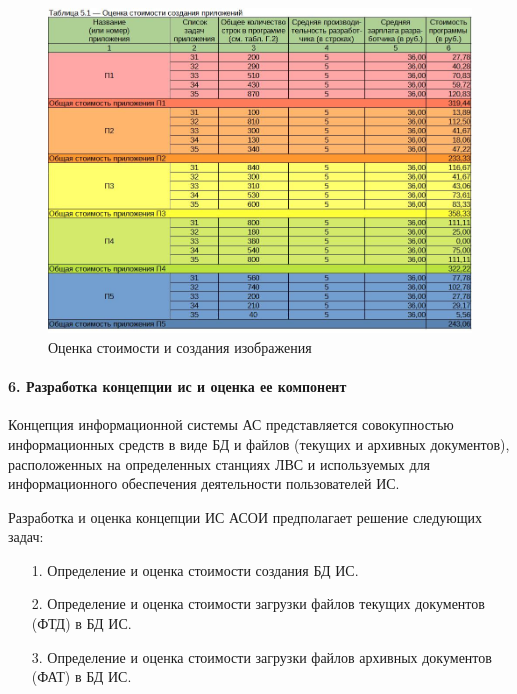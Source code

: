 \documentclass[12pt, a4paper, simple]{eskdtext}
\begin{document}
    \begin{figure}[ph!]
        \centering
        \includegraphics[width=16cm]
            {_docs/Таблица5-1ОценкаСтоимостиСозданияПриложений.jpg}
        \caption{Оценка стоимости и создания изображения}
    \end{figure}

    \newpage

    \paragraph{6. Разработка концепции ис и оценка ее компонент} \hspace{0pt}

    Концепция информационной системы АС представляется совокупностью информационных средств в виде БД и файлов (текущих и архивных документов), расположенных на определенных стан­циях ЛВС и используемых для информационного обеспечения деятельности пользователей ИС.

    Разработка и оценка концепции ИС АСОИ предполагает ре­шение следую­щих задач:
    \begin{enumerate}
        \item[1.] Определение и оценка стоимости создания БД ИС.
        \item[2.] Определение и оценка стоимости загрузки файлов текущих документов (ФТД) в БД ИС.
        \item[3.] Определение и оценка стоимости загрузки файлов архивных документов (ФАТ) в БД ИС.
    \end{enumerate}
\end{document}
